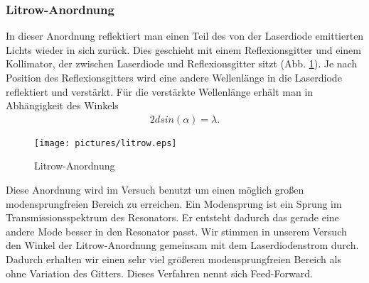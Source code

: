 \documentclass[12pt]{article}
\begin{document}
\subsubsection{Litrow-Anordnung}
In dieser Anordnung reflektiert man einen Teil des von der Laserdiode emittierten Lichts wieder in sich zurück. Dies geschieht mit einem Reflexionsgitter und einem Kollimator, der zwischen Laserdiode und Reflexionsgitter sitzt (Abb. \ref{litrow}). Je nach Position des Reflexionsgitters wird eine andere Wellenlänge in die Laserdiode reflektiert und verstärkt. Für die verstärkte Wellenlänge erhält man in Abhängigkeit des Winkels
\begin{align}
\label{litrowpeak}
 2d sin(\alpha) = \lambda.
\end{align}
\begin{figure}[H]
 \texttt{[image: pictures/litrow.eps]}
 \caption{Litrow-Anordnung}
 \label{litrow}
\end{figure}
Diese Anordnung wird im Versuch benutzt um einen möglich großen modensprungfreien Bereich zu erreichen. Ein Modensprung ist ein Sprung im Transmissionsspektrum des Resonators. Er entsteht dadurch das gerade eine andere Mode besser in den Resonator passt. Wir stimmen in unserem Versuch den Winkel der Litrow-Anordnung gemeinsam mit dem Laserdiodenstrom durch. Dadurch erhalten wir einen sehr viel größeren modensprungfreien Bereich als ohne Variation des Gitters. Dieses Verfahren nennt sich Feed-Forward.
\end{document}
